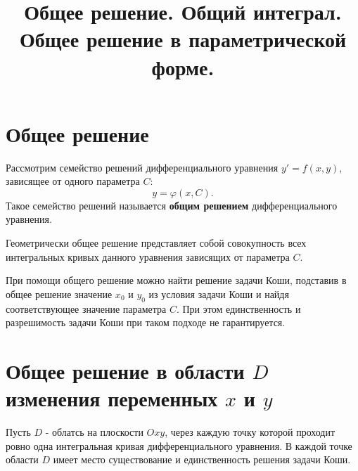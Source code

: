 \documentclass[12pt]{article}
\title{Общее решение. Общий интеграл. Общее решение в параметрической форме.}
\begin{document}
\maketitle

\section{Общее решение}
Рассмотрим семейство решений дифференциального уравнения $y' = f(x, y)$, зависящее от одного параметра $C$:
\[y = \varphi(x, C).\]
Такое семейство решений называется \textbf{общим решением} дифференциального уравнения.

Геометрически общее решение представляет собой совокупность всех интегральных кривых данного уравнения
зависящих от параметра $C$.

При помощи общего решение можно найти решение задачи Коши, подставив в
общее решение значение $x_0$ и $y_0$ из условия задачи Коши и найдя соответствующее
значение параметра $C$. При этом единственность и разрешимость задачи Коши при таком
подходе не гарантируется.

\section{Общее решение в области $D$ изменения переменных $x$ и $y$}
Пусть $D$ - облатсь на плоскости $Oxy$, через каждую точку которой
проходит ровно одна интегральная кривая дифференциального уравнения.
В каждой точке области $D$ имеет место существование и единственность решения задачи Коши.
\end{document}
